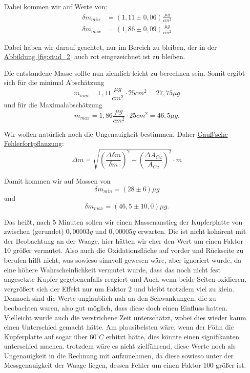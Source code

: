 Dabei kommen wir auf Werte von:
\begin{align}
    \delta m_{min} &= (1,11 \pm 0,06)\frac{\mu g}{cm^2} \\
    \delta m_{max} &= (1,86 \pm 0,09)\frac{\mu g}{cm^2}
\end{align}

Dabei haben wir darauf geachtet, nur im Bereich zu bleiben, der in der \hyperref[fig:stud_2]{Abbildung \ref*{fig:stud_2}} auch rot eingezeichnet ist zu bleiben.

Die entstandene Masse sollte nun ziemlich leicht zu berechnen sein. Somit ergibt sich für die minimal Abschätzung
\begin{equation}
    m_{min} = 1,11 \frac{\mu g}{cm^2} \cdot 25cm^2 = 27,75 \mu g 
\end{equation}
und für die Maximalabschätzung
\begin{equation}
    m_{max} = 1,86 \frac{\mu g}{cm^2} \cdot 25cm^2 = 46,5 \mu g.
\end{equation}

Wir wollen natürlich noch die Ungenauigkeit bestimmen. Daher \hyperref[eq:gauss_fehlfortpflanzung]{Gauß'sche Fehlerfortpflanzung}:
\begin{equation}
    \Delta m = \sqrt{\left(\frac{\Delta \delta m}{\delta m} \right)^2 + \left(\frac{\Delta A_{Cu}}{A_{Cu}} \right)^2} \cdot m
\end{equation}

Damit kommen wir auf Massen von 
\begin{equation}
    \boxed{\delta m_{min} = (28 \pm 6) \mu g}
\end{equation}
und
\begin{equation}
    \boxed{\delta m_{max} = (46,5 \pm 10,0 ) \mu g}.
\end{equation}

Das heißt, nach 5 Minuten sollen wir einen Massenanstieg der Kupferplatte von zwischen (gerundet) $0,00003g$ und $0,00005g$ erwarten.
Die ist nicht kohärent mit der Beobachtung an der Waage, hier hätten wir eher den Wert um einen Faktor 10 größer vermutet.
Also auch die Oxidationsfläche auf vorder und Rückseite zu berufen hilft nicht, was sowieso sinnvoll gewesen wäre, aber ignoriert wurde, da eine höhere Wahrscheinlichkeit vermutet wurde, dass das noch nicht fest angesetzte Kupfer gegebenenfalls reagiert und Auch wenn beide Seiten oxidieren, vergrößert sich der Effekt nur um Faktor 2 und bleibt trotzdem viel zu klein.
Dennoch sind die Werte unglaublich nah an den Schwankungen, die zu beobachten waren, also gut möglich, dass diese doch einen Einfluss hatten. Vielleicht wurde auch die verstrichene Zeit unterschätzt, wobei dies wieder kaum einen Unterschied gemacht hätte. Am plausibelsten wäre, wenn der Föhn die Kupferplatte auf sogar über $60^\circ C$ erhitzt hätte, dies könnte einen signifikanten unterschied machen.
trotzdem wäre es nicht zielführend, diese Werte noch als Ungenauigkeit in die Rechnung mit aufzunehmen, da diese sowieso unter der Messgenauigkeit der Waage liegen, dessen Fehler um einen Faktor 100 größer ist.

